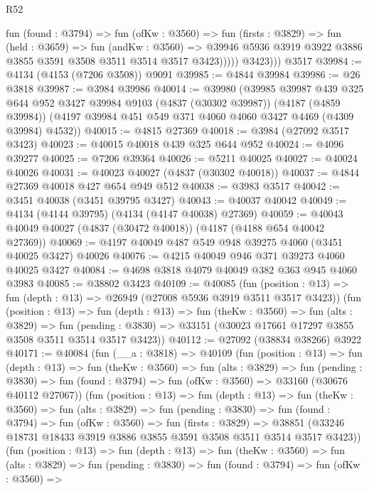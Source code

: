 \begin{lexlean}{R52}
\begin{coremodule}
                fun (found : @3794) =>
                fun (ofKw : @3560) =>
                fun (firsts : @3829) =>
                fun (held : @3659) =>
                fun (andKw : @3560) =>
                @39946 @5936 @3919 @3922 @3886 @3855 @3591 @3508 @3511 @3514 @3517 @3423)))))
          @3423)))
    @3517
@39984 := @4134 (@4153 (@7206 @3508)) @9091
@39985 := @4844 @39984
@39986 := @26 @3818
@39987 := @3984 @39986
@40014 := @39980
    (@39985
      @39987
      @439
      @325
      @644
      @952
      @3427
      @39984
      @9103
      (@4837 (@30302 @39987))
      (@4187 (@4859 @39984))
      (@4197 @39984 @451 @549 @371 @4060 @4060 @3427 @4469 (@4309 @39984) @4532))
@40015 := @4815 @27369
@40018 := @3984 (@27092 @3517 @3423)
@40023 := @40015 @40018 @439 @325 @644 @952
@40024 := @4096 @39277
@40025 := @7206 @39364
@40026 := @5211 @40025
@40027 := @40024 @40026
@40031 := @40023 @40027 (@4837 (@30302 @40018))
@40037 := @4844 @27369 @40018 @427 @654 @949 @512
@40038 := @3983 @3517
@40042 := @3451 @40038 (@3451 @39795 @3427)
@40043 := @40037 @40042
@40049 := @4134 (@4144 @39795) (@4134 (@4147 @40038) @27369)
@40059 := @40043 @40049 @40027 (@4837 (@30472 @40018)) (@4187 (@4188 @654 @40042 @27369))
@40069 := @4197 @40049 @487 @549 @948 @39275 @4060 (@3451 @40025 @3427) @40026
@40076 := @4215 @40049 @946 @371 @39273 @4060 @40025 @3427
@40084 := @4698 @3818 @4079 @40049 @382 @363 @945 @4060 @3983
@40085 := @38802 @3423
@40109 := @40085
    (fun (position : @13) => fun (depth : @13) => @26949 (@27008 @5936 @3919 @3511 @3517 @3423))
    (fun (position : @13) =>
    fun (depth : @13) =>
    fun (theKw : @3560) =>
    fun (alts : @3829) =>
    fun (pending : @3830) => @33151 (@30023 @17661 @17297 @3855 @3508 @3511 @3514 @3517 @3423))
@40112 := @27092 (@38834 @38266) @3922
@40171 := @40084
    (fun (__a : @3818) =>
    @40109
      (fun (position : @13) =>
      fun (depth : @13) =>
      fun (theKw : @3560) =>
      fun (alts : @3829) =>
      fun (pending : @3830) =>
      fun (found : @3794) => fun (ofKw : @3560) => @33160 (@30676 @40112 @27067))
      (fun (position : @13) =>
      fun (depth : @13) =>
      fun (theKw : @3560) =>
      fun (alts : @3829) =>
      fun (pending : @3830) =>
      fun (found : @3794) =>
      fun (ofKw : @3560) =>
      fun (firsts : @3829) =>
      @38851 (@33246 @18731 @18433 @3919 @3886 @3855 @3591 @3508 @3511 @3514 @3517 @3423))
      (fun (position : @13) =>
      fun (depth : @13) =>
      fun (theKw : @3560) =>
      fun (alts : @3829) =>
      fun (pending : @3830) =>
      fun (found : @3794) =>
      fun (ofKw : @3560) =>

\end{coremodule}
\end{lexlean}
